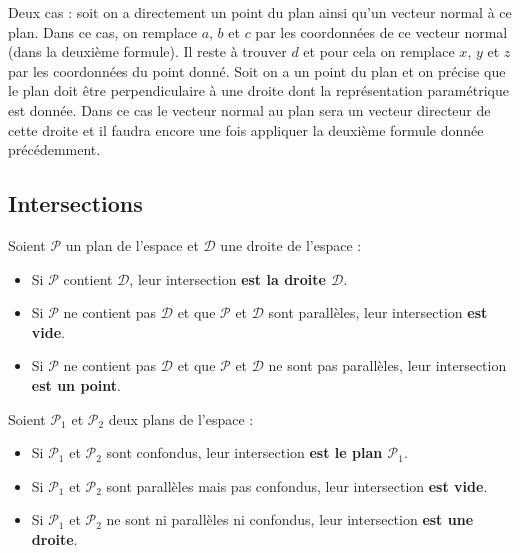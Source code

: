 	\begin{tip}
		Deux cas : soit on a directement un point du plan ainsi qu'un vecteur normal à ce plan. Dans ce cas, on remplace $a$, $b$ et $c$ par les coordonnées de ce vecteur normal (dans la deuxième formule). Il reste à trouver $d$ et pour cela on remplace $x$, $y$ et $z$ par les coordonnées du point donné.
		\newpar
		Soit on a un point du plan et on précise que le plan doit être perpendiculaire à une droite dont la représentation paramétrique est donnée. Dans ce cas le vecteur normal au plan sera un vecteur directeur de cette droite et il faudra encore une fois appliquer la deuxième formule donnée précédemment.
	\end{tip}

	\subsection{Intersections}

	\begin{formula}
		Soient $\mathcal{P}$ un plan de l'espace et $\mathcal{D}$ une droite de l'espace :
		\begin{itemize}
			\item Si $\mathcal{P}$ contient $\mathcal{D}$, leur intersection \textbf{est la droite $\mathcal{D}$}.
			\item Si $\mathcal{P}$ ne contient pas $\mathcal{D}$ et que $\mathcal{P}$ et $\mathcal{D}$ sont parallèles, leur intersection \textbf{est vide}.
			\item Si $\mathcal{P}$ ne contient pas $\mathcal{D}$ et que $\mathcal{P}$ et $\mathcal{D}$ ne sont pas parallèles, leur intersection \textbf{est un point}.
		\end{itemize}
	\end{formula}

	\begin{formula}
		Soient $\mathcal{P}_1$ et $\mathcal{P}_2$ deux plans de l'espace :
		\begin{itemize}
			\item Si $\mathcal{P}_1$ et $\mathcal{P}_2$ sont confondus, leur intersection \textbf{est le plan $\mathcal{P}_1$}.
			\item Si $\mathcal{P}_1$ et $\mathcal{P}_2$ sont parallèles mais pas confondus, leur intersection \textbf{est vide}.
			\item Si $\mathcal{P}_1$ et $\mathcal{P}_2$ ne sont ni parallèles ni confondus, leur intersection \textbf{est une droite}.
		\end{itemize}
	\end{formula}

